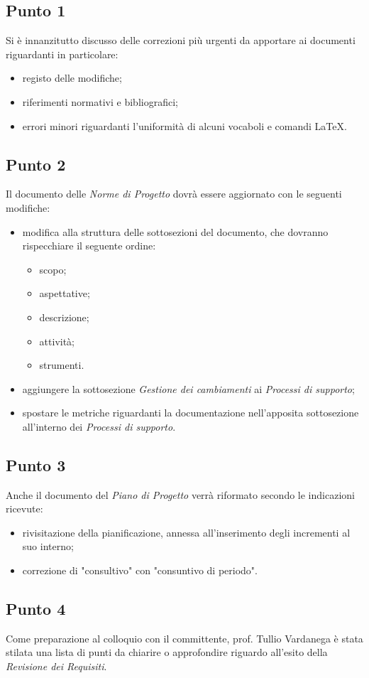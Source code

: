     \subsection{Punto 1}
        Si è innanzitutto discusso delle correzioni più urgenti da apportare ai documenti riguardanti in particolare:
        \begin{itemize}
            \item registo delle modifiche;
            \item riferimenti normativi e bibliografici;
            \item errori minori riguardanti l'uniformità di alcuni vocaboli e comandi \LaTeX.
        \end{itemize}
    \subsection{Punto 2}
        Il documento delle \textit{Norme di Progetto} dovrà essere aggiornato con le seguenti modifiche:
        \begin{itemize}
            \item modifica alla struttura delle sottosezioni del documento, che dovranno rispecchiare il seguente ordine:
            \begin{itemize}
                \item scopo;
                \item aspettative;
                \item descrizione;
                \item attività;
                \item strumenti.
            \end{itemize}
            \item aggiungere la sottosezione \textit{Gestione dei cambiamenti} ai \textit{Processi di supporto};
            \item spostare le metriche riguardanti la documentazione nell'apposita sottosezione all'interno dei \textit{Processi di supporto}.
        \end{itemize} 
    \subsection{Punto 3}
        Anche il documento del \textit{Piano di Progetto} verrà riformato secondo le indicazioni ricevute:
        \begin{itemize}
            \item rivisitazione della pianificazione, annessa all'inserimento degli incrementi al suo interno;
            \item correzione di "consultivo" con "consuntivo di periodo".
        \end{itemize}
    \subsection{Punto 4}
        Come preparazione al colloquio con il committente, prof. Tullio Vardanega è stata stilata una lista di punti da chiarire o approfondire riguardo all'esito della \textit{Revisione dei Requisiti}.
